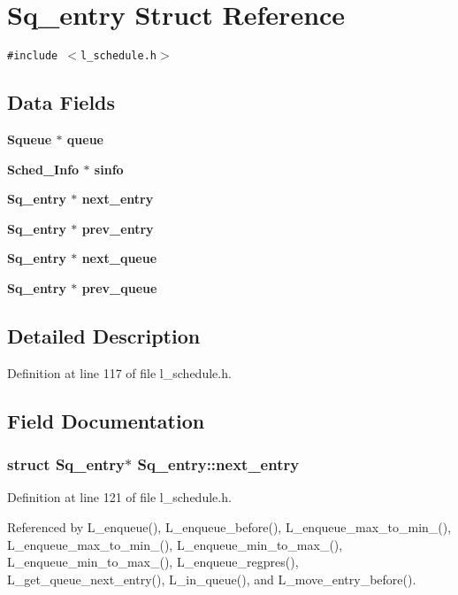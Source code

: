 \section{Sq\_\-entry Struct Reference}
\label{structSq__entry}
{\tt \#include $<$l\_\-schedule.h$>$}

\subsection*{Data Fields}
\begin{CompactItemize}
\item 
\bf{Squeue} $\ast$ \bf{queue}
\item 
\bf{Sched\_\-Info} $\ast$ \bf{sinfo}
\item 
\bf{Sq\_\-entry} $\ast$ \bf{next\_\-entry}
\item 
\bf{Sq\_\-entry} $\ast$ \bf{prev\_\-entry}
\item 
\bf{Sq\_\-entry} $\ast$ \bf{next\_\-queue}
\item 
\bf{Sq\_\-entry} $\ast$ \bf{prev\_\-queue}
\end{CompactItemize}


\subsection{Detailed Description}




Definition at line 117 of file l\_\-schedule.h.

\subsection{Field Documentation}
\subsubsection{\setlength{\rightskip}{0pt plus 5cm}struct \bf{Sq\_\-entry}$\ast$ \bf{Sq\_\-entry::next\_\-entry}}\label{structSq__entry_06d0ad1b3078e0034e33eb329297a883}




Definition at line 121 of file l\_\-schedule.h.

Referenced by L\_\-enqueue(), L\_\-enqueue\_\-before(), L\_\-enqueue\_\-max\_\-to\_\-min\_(), L\_\-enqueue\_\-max\_\-to\_\-min\_(), L\_\-enqueue\_\-min\_\-to\_\-max\_(), L\_\-enqueue\_\-min\_\-to\_\-max\_(), L\_\-enqueue\_\-regpres(), L\_\-get\_\-queue\_\-next\_\-entry(), L\_\-in\_\-queue(), and L\_\-move\_\-entry\_\-before().
